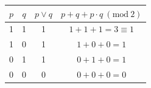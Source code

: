 \begin{table}[h!]
\centering
\begin{tabular}{cccc}
\hline
$p$ & $q$ & $p \lor q$ & $p+q+p\cdot q \ (\mathrm{mod}\ 2)$ \\
\hline
1 & 1 & 1 & $1+1+1=3\equiv1$ \\
1 & 0 & 1 & $1+0+0=1$ \\
0 & 1 & 1 & $0+1+0=1$ \\
0 & 0 & 0 & $0+0+0=0$ \\
\hline
\end{tabular}
\end{table}
